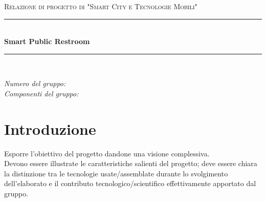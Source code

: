 \documentclass[12pt]{article}
\begin{document}

\begin{titlepage}

\newcommand{\HRule}{\rule{\linewidth}{0.5mm}}

\center

\textsc{\Large Relazione di progetto di "Smart City e Tecnologie Mobili"}\\[0.5cm]

\HRule \\[0.4cm]
{ \huge \bfseries Smart Public Restroom }\\[0.4cm]
\HRule \\[1.5cm]

\vfill

\begin{flushleft}
\emph{Numero del gruppo:}\\[1cm]
\emph{Componenti del gruppo:}\\[3cm]
\end{flushleft}



\end{titlepage}


\tableofcontents

\newpage


\section{Introduzione}

Esporre l’obiettivo del progetto dandone una visione complessiva.\\

Devono essere illustrate le caratteristiche salienti del progetto; deve essere chiara la distinzione tra le tecnologie usate/assemblate durante lo svolgimento dell'elaborato e il contributo tecnologico/scientifico effettivamente apportato dal gruppo.\\
\end{document}
